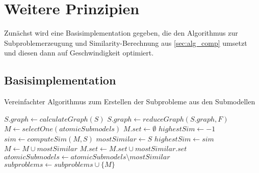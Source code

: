 \chapter{Weitere Prinzipien} 

Zunächst wird eine Basisimplementation gegeben, die den Algorithmus zur Subproblemerzeugung und Similarity-Berechnung aus \autoref{sec:alg_comp} umsetzt und diesen dann auf Geschwindigkeit optimiert.

\section{Basisimplementation}

\begin{algorithm}
	\caption{Vereinfachter Algorithmus zum Erstellen der Subprobleme aus den Submodellen}\label{lst:create_sub}
	\begin{algorithmic}[1]
				\State $S.graph \gets calculateGraph(S)$
				\State $S.graph \gets reduceGraph(S.graph, F)$
			\EndFor {}
			 
				\State $M \gets selectOne(atomicSubmodels)$
				\State $M.set \gets \emptyset$
					\State $highestSim \gets -1$					
						\State $sim \gets computeSim(M, S)$
							\State $mostSimilar \gets S$
							\State $highestSim \gets sim$
						\EndIf
					\EndFor
					\State $M \gets M \cup mostSimilar$
					\State $M.set \gets M.set \cup mostSimilar.set$
					\State $atomicSubmodels \gets atomicSubmodels \setminus mostSimilar$
				\EndWhile
				\State $subproblems \gets subproblems \cup \{M\}$
			\EndWhile		
		\EndProcedure
	\end{algorithmic}
\end{algorithm}

